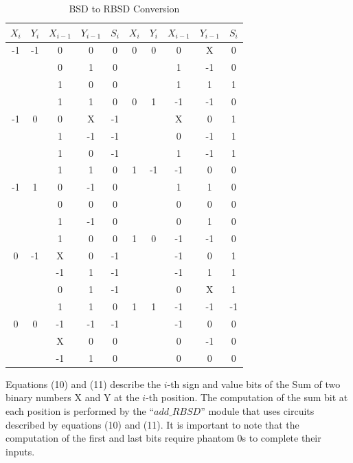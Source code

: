 \documentclass[conference]{IEEEtran_NCC}
\begin{document}
\setlength{\tabcolsep}{0.4em}
\begin{table}[h!]
  \centering
  \caption{BSD to RBSD Conversion}
  \label{tab:table4}
  \begin{tabular}{|c|c|c|c||c|||c|c|c|c||c|}
    \hline
    $X_{i}$ & $Y_{i}$ & $X_{i-1}$ & $Y_{i-1}$ & $S_{i}$  &  $X_{i}$ & $Y_{i}$ & $X_{i-1}$ & $Y_{i-1}$ & $S_{i}$ \\
    \hline
    \hline
    -1 & -1 & 0 & 0 & 0  &  0 & 0 & 0 & X & 0 \\
    \hline
    & & 0 & 1 & 0  &  & & 1 & -1 & 0 \\
    \hline
    & & 1 & 0 & 0  &  & & 1 & 1 & 1 \\
    \hline
    & & 1 & 1 & 0  &  0 & 1 & -1 & -1 & 0 \\
    \hline
    -1 & 0 & 0 & X & -1  &  & & X & 0 & 1 \\
    \hline
    & & 1 & -1 & -1  &  & & 0 & -1 & 1 \\
    \hline
    & & 1 & 0 & -1  &  & & 1 & -1 & 1 \\
    \hline
    & & 1 & 1 & 0  &  1 & -1 & -1 & 0 & 0 \\
    \hline
    -1 & 1 & 0 & -1 & 0  &  & & 1 & 1 & 0 \\
    \hline
    & & 0 & 0 & 0  &  & & 0 & 0 & 0 \\
    \hline
    & & 1 & -1 & 0 &  & & 0 & 1 & 0 \\
    \hline
    & & 1 & 0 & 0  &  1 & 0 & -1 & -1 & 0 \\
    \hline
    0 & -1 & X & 0 & -1  &  & & -1 & 0 & 1 \\
    \hline
    & & -1 & 1 & -1  &  & & -1 & 1 & 1 \\
    \hline
    & & 0 & 1 & -1  &  & & 0 & X & 1 \\
    \hline
    & & 1 & 1 & 0  &  1 & 1 & -1 & -1 & -1 \\
    \hline
    0 & 0 & -1 & -1 & -1  &  & & -1 & 0 & 0 \\
    \hline
    & & X & 0 & 0  &  & & 0 & -1 & 0 \\
    \hline
    & & -1 & 1 & 0  &  & & 0 & 0 & 0 \\
    \hline
  \end{tabular}
\end{table}

Equations (10) and (11) describe the $i$-th sign and value bits of the Sum of two binary numbers X and Y at the $i$-th position. The computation of the sum bit at each position is performed by the ``$add\_RBSD$'' module that uses circuits described by equations (10) and (11). It is important to note that the computation of the first and last bits require phantom 0s to complete their inputs.
\end{document}
